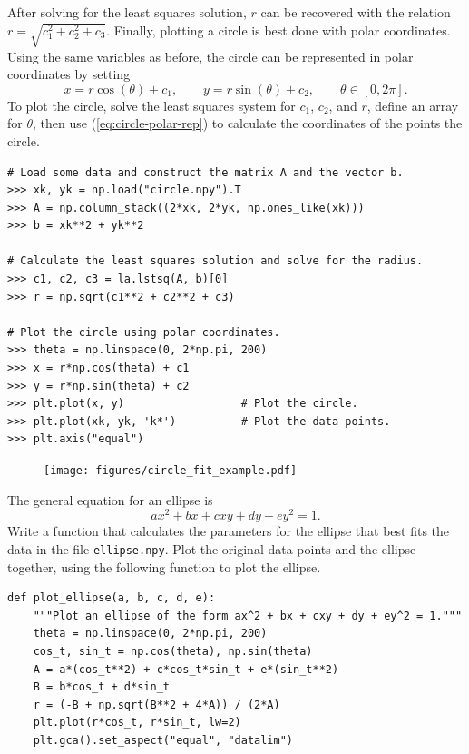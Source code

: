 After solving for the least squares solution, $r$ can be recovered with the relation $r = \sqrt{c_1^2 + c_2^2 + c_3}$.
Finally, plotting a circle is best done with polar coordinates.
Using the same variables as before, the circle can be represented in polar coordinates by setting
\begin{equation}
x = r\cos(\theta) + c_1, \qquad
y = r\sin(\theta) + c_2, \qquad
\theta\in [0,2\pi].
\label{eq:circle-polar-rep}
\end{equation}
To plot the circle, solve the least squares system for $c_1$, $c_2$, and $r$, define an array for $\theta$, then use (\ref{eq:circle-polar-rep}) to calculate the coordinates of the points the circle.

\begin{lstlisting}
# Load some data and construct the matrix A and the vector b.
>>> xk, yk = np.load("circle.npy").T
>>> A = np.column_stack((2*xk, 2*yk, np.ones_like(xk)))
>>> b = xk**2 + yk**2

# Calculate the least squares solution and solve for the radius.
>>> c1, c2, c3 = la.lstsq(A, b)[0]
>>> r = np.sqrt(c1**2 + c2**2 + c3)

# Plot the circle using polar coordinates.
>>> theta = np.linspace(0, 2*np.pi, 200)
>>> x = r*np.cos(theta) + c1
>>> y = r*np.sin(theta) + c2
>>> plt.plot(x, y)                  # Plot the circle.
>>> plt.plot(xk, yk, 'k*')          # Plot the data points.
>>> plt.axis("equal")
\end{lstlisting}

\begin{figure}[H]
    \texttt{[image: figures/circle\_fit\_example.pdf]}
\end{figure}

\begin{problem}
\label{prob:lstsq-ellipse-fit}
The general equation for an ellipse is \[ax^2 + bx + cxy + dy + ey^2 = 1.\]
Write a function that calculates the parameters for the ellipse that best fits the data in the file \texttt{ellipse.npy}.
Plot the original data points and the ellipse together, using the following function to plot the ellipse.

\begin{lstlisting}
def plot_ellipse(a, b, c, d, e):
    """Plot an ellipse of the form ax^2 + bx + cxy + dy + ey^2 = 1."""
    theta = np.linspace(0, 2*np.pi, 200)
    cos_t, sin_t = np.cos(theta), np.sin(theta)
    A = a*(cos_t**2) + c*cos_t*sin_t + e*(sin_t**2)
    B = b*cos_t + d*sin_t
    r = (-B + np.sqrt(B**2 + 4*A)) / (2*A)
    plt.plot(r*cos_t, r*sin_t, lw=2)
    plt.gca().set_aspect("equal", "datalim")
\end{lstlisting}
\end{problem}

